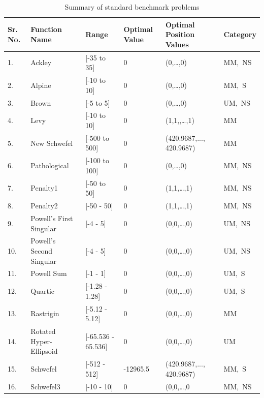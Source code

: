 \begin{table}[t]
\scriptsize
\centering
\caption[Standard benchmark functions]{\fontsize{10}{12} \selectfont Summary of standard benchmark problems}
\renewcommand{\arraystretch}{1.2}
 \begin{tabular}{p{0.3in} p{1.2in}  p{0.9in} p{0.8in} p{1.5in} p{0.6in}}
    \hline
\textbf{Sr. No.}  &\textbf{Function Name}    &                \textbf{Range }     & \textbf{Optimal Value} &\textbf{Optimal Position Values }&\textbf{Category}\\
\hline

1.    &    Ackley    &        [-35 to 35]    &     0    &     (0,\dots,0) & MM,\ NS\\
2.    &    Alpine    &        [-10 to 10]     &    0    &     (0,\dots,0)& MM,\ S\\
3.    &    Brown    &    [-5 to 5] &    0    &    (0,\dots,0)& UM,\ NS\\
4.    &    Levy    &    [-10 to 10]     &     0    &     (1,1,,\dots,1)& MM\\
5.    &    New Schwefel    &        [-500 to 500]     &    0    &     (420.9687,..., 420.9687)& MM\\
6.    &    Pathological    &        [-100 to 100]     &    0    &    (0,\dots,0)& MM,\ NS\\
7.    &    Penalty1    &         [-50 to 50]    &     0    &    (1,1,\dots,1)    & MM,\ NS\\
8.    &    Penalty2    &         [-50 - 50]        & 0    &      (1,1,\dots,1) &MM,\ NS\\
9.    &    Powell's First Singular    &        [-4 - 5]    &    0     &    (0,0,\dots,0)& UM,\ NS\\
10.    &    Powell's Second Singular    &        [-4 - 5]    &    0    &     (0,0,\dots,0) & UM,\ NS\\
11.    &    Powell Sum    &        [-1 - 1]    &    0     &    (0,0,\dots,0)    & UM,\ S\\
12.    &    Quartic    &        [-1.28 - 1.28]    &    0    &    (0,0,\dots,0)    & UM,\ S\\
13.    &    Rastrigin    &        [-5.12 - 5.12]    &    0    &     (0,0,\dots,0)    & MM\\
14.    &    Rotated Hyper-Ellipsoid    &        [-65.536 - 65.536]     &    0    &     (0,0,\dots,0)    & UM\\
15.    &    Schwefel    &        [-512 - 512]    &    -12965.5     &         (420.9687,..., 420.9687)& MM,\ S\\
16.    &    Schwefel3    &    [-10 - 10]     &     0    &     (0,0,\dots,0& MM,\ NS \\

\end{tabular}
\end{table}
